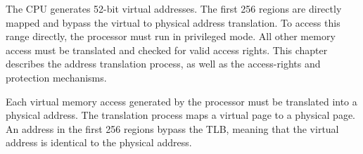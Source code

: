 %
%


The CPU generates 52-bit virtual addresses. The first 256 regions are directly mapped and bypass the virtual to physical address translation. To access this range directly, the processor must run in privileged mode. All other memory access must be translated and checked for valid access rights. This chapter describes the address translation process, as well as the access-rights and protection mechanisms.


Each virtual memory access generated by the processor must be translated into a physical address. The translation process maps a virtual page to a physical page. An address in the first 256 regions bypass the TLB, meaning that the virtual address is identical to the physical address.

